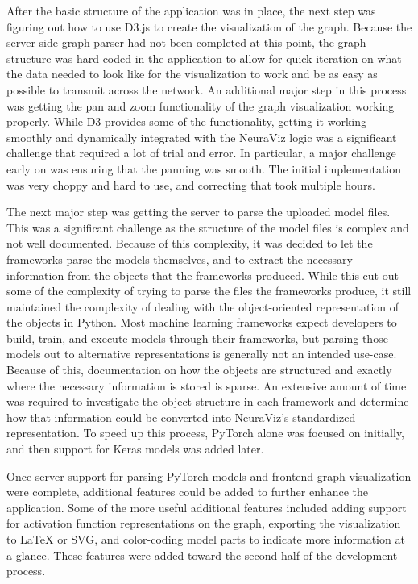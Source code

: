 After the basic structure of the application was in place, the next step was figuring out how to use D3.js to create the visualization of the graph. Because the server-side graph parser had not been completed at this point, the graph structure was hard-coded in the application to allow for quick iteration on what the data needed to look like for the visualization to work and be as easy as possible to transmit across the network. An additional major step in this process was getting the pan and zoom functionality of the graph visualization working properly. While D3 provides some of the functionality, getting it working smoothly and dynamically integrated with the NeuraViz logic was a significant challenge that required a lot of trial and error. In particular, a major challenge early on was ensuring that the panning was smooth. The initial implementation was very choppy and hard to use, and correcting that took multiple hours.

The next major step was getting the server to parse the uploaded model files. This was a significant challenge as the structure of the model files is complex and not well documented. Because of this complexity, it was decided to let the frameworks parse the models themselves, and to extract the necessary information from the objects that the frameworks produced. While this cut out some of the complexity of trying to parse the files the frameworks produce, it still maintained the complexity of dealing with the object-oriented representation of the objects in Python. Most machine learning frameworks expect developers to build, train, and execute models through their frameworks, but parsing those models out to alternative representations is generally not an intended use-case. Because of this, documentation on how the objects are structured and exactly where the necessary information is stored is sparse. An extensive amount of time was required to investigate the object structure in each framework and determine how that information could be converted into NeuraViz's standardized representation. To speed up this process, PyTorch alone was focused on initially, and then support for Keras models was added later.

Once server support for parsing PyTorch models and frontend graph visualization were complete, additional features could be added to further enhance the application. Some of the more useful additional features included adding support for activation function representations on the graph, exporting the visualization to \LaTeX{} or SVG, and color-coding model parts to indicate more information at a glance. These features were added toward the second half of the development process.

